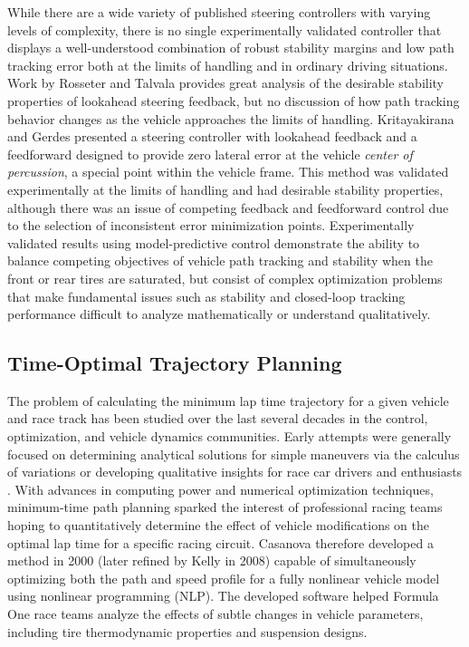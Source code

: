 While there are a wide variety of published steering controllers with varying levels of complexity, there is no single experimentally validated
controller that displays a well-understood combination of robust stability margins and low path tracking error both at the limits of handling and
in ordinary driving situations. Work by
 Rosseter \cite{rosseter} and Talvala \cite{talvthesis} provides great analysis of the
desirable stability properties of lookahead steering feedback, but no discussion of how path tracking behavior changes as the
vehicle approaches the limits of handling. Kritayakirana and Gerdes \cite{mickcop} 
presented a steering controller with lookahead feedback and a feedforward designed to provide zero lateral error at the vehicle \textit{center of percussion}, a special point within the vehicle frame. 
This method was validated experimentally at the limits of handling and had desirable stability properties, although there was an
issue of competing feedback and feedforward control due to the selection of inconsistent error minimization points. 
Experimentally validated results using model-predictive control \cite{carvalho13}\cite{joethesis} demonstrate the ability to balance competing
objectives of vehicle path tracking and stability when the front or rear tires are saturated, but 
consist of complex optimization problems that make fundamental issues such as stability and closed-loop tracking performance difficult to analyze mathematically or
understand qualitatively. 

\subsection{Time-Optimal Trajectory Planning}
\label{pw2}

The problem of calculating the minimum lap time trajectory for a given vehicle and race track has been studied over the last several decades
in the control, optimization, and vehicle dynamics communities. Early attempts were generally focused on determining analytical
solutions for simple maneuvers via the calculus of variations \cite{hendrikx} or developing qualitative insights for race car drivers and enthusiasts \cite{mken}\cite{taruffi}. With advances in computing power and numerical optimization techniques, 
minimum-time path planning sparked the interest of professional racing teams hoping
to quantitatively determine the effect of vehicle modifications on the optimal lap time for a specific racing circuit. Casanova \cite{casanova} therefore developed a method in 2000 (later 
refined by Kelly \cite{kelly} in 2008) capable of simultaneously optimizing both the path and speed profile
for a fully nonlinear vehicle model using nonlinear programming (NLP). The developed software helped Formula One race teams
analyze the effects of subtle changes in vehicle parameters, including tire thermodynamic properties and suspension designs.

